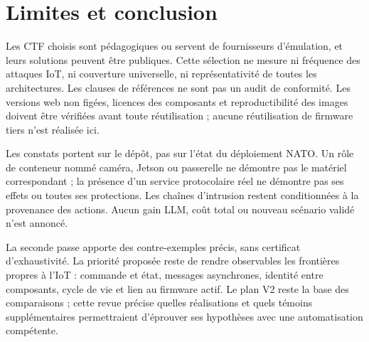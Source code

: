 \documentclass[11pt,a4paper]{article}
\begin{document}
\section{Limites et conclusion}
Les CTF choisis sont pédagogiques ou servent de fournisseurs d'émulation, et leurs solutions peuvent être publiques. Cette sélection ne mesure ni fréquence des attaques IoT, ni couverture universelle, ni représentativité de toutes les architectures. Les clauses de références ne sont pas un audit de conformité. Les versions web non figées, licences des composants et reproductibilité des images doivent être vérifiées avant toute réutilisation ; aucune réutilisation de firmware tiers n'est réalisée ici.

Les constats portent sur le dépôt, pas sur l'état du déploiement NATO. Un rôle de conteneur nommé caméra, Jetson ou passerelle ne démontre pas le matériel correspondant ; la présence d'un service protocolaire réel ne démontre pas ses effets ou toutes ses protections. Les chaînes d'intrusion restent conditionnées à la provenance des actions. Aucun gain LLM, coût total ou nouveau scénario validé n'est annoncé.

La seconde passe apporte des contre-exemples précis, sans certificat d'exhaustivité. La priorité proposée reste de rendre observables les frontières propres à l'IoT : commande et état, messages asynchrones, identité entre composants, cycle de vie et lien au firmware actif. Le plan V2 reste la base des comparaisons ; cette revue précise quelles réalisations et quels témoins supplémentaires permettraient d'éprouver ses hypothèses avec une automatisation compétente.
\end{document}
